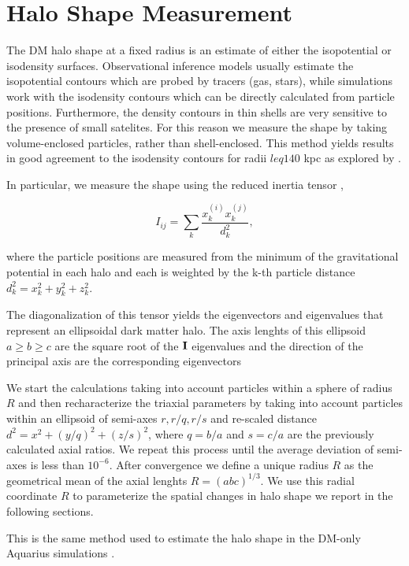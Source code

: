 \documentclass[a4paper,fleqn,usenatbib]{mnras}
\begin{document}
\section{Halo Shape Measurement}


The DM halo shape at a fixed radius is an estimate of either
the isopotential or isodensity surfaces.  
Observational inference models usually estimate the 
isopotential contours which are probed by tracers (gas, stars), while
simulations work with the isodensity contours which can be directly
calculated from particle positions.  
Furthermore, the density contours in thin shells are very sensitive to
the presence of small satelites.  
For this reason we measure the shape by taking
volume-enclosed particles, rather than shell-enclosed.  
This method yields results in good agreement to the isodensity
contours for radii $leq 140$ kpc as explored by
\citep{VeraCiro11}.  


In particular, we measure the shape using the reduced inertia tensor
\citep{Allgood_et_al._2006},  

\begin{equation}
I_{ij} = \sum_k \frac{x_k^{(i)}x_k^{(j)}}{d^2_k},
\label{eq:inertia}
\end{equation}

where the particle positions are measured from the minimum of the
gravitational potential in each halo and each is weighted by the k-th
particle distance 
$d_k^2=x_k^2+y_k^2+z_k^2$.

The diagonalization of this tensor yields the eigenvectors and
eigenvalues that represent an ellipsoidal dark matter halo.
The axis lenghts of this ellipsoid $a\geq b \geq c$ are the square
root of the ${\bf I}$ eigenvalues and the direction of the principal
axis are the corresponding eigenvectors 

We start the calculations taking into account particles within a
sphere of radius $R$ and then recharacterize the triaxial parameters
by taking into account particles within an ellipsoid of semi-axes
$r,r/q,r/s$ and re-scaled distance $d^2=x^2+(y/q)^2+(z/s)^2$, where $q
= b/a$ and $s=c/a$ are the previously calculated axial ratios. 
We repeat this process until the average deviation of semi-axes is
less than $10^{-6}$.  
After convergence we define a unique radius $R$ as the geometrical
mean of the axial lenghts $R=(abc)^{1/3}$.
We use this radial coordinate $R$ to parameterize the spatial changes
in halo shape we report in the following sections.

This is the same method used to estimate the halo shape in the DM-only
Aquarius simulations \citep{VeraCiro11}. 
\end{document}
